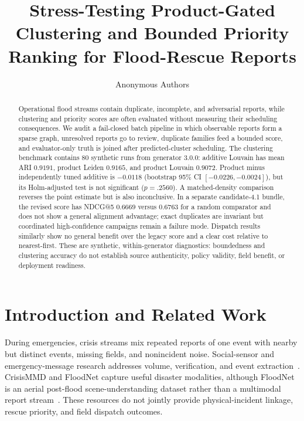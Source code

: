 \documentclass[runningheads]{llncs}
\begin{document}
\title{Stress-Testing Product-Gated Clustering and Bounded Priority
Ranking for Flood-Rescue Reports}

\author{Anonymous Authors}

\maketitle

\begin{abstract}
Operational flood streams contain duplicate, incomplete, and adversarial
reports, while clustering and priority scores are often evaluated without
measuring their scheduling consequences. We audit a fail-closed batch
pipeline in which observable reports form a sparse graph, unresolved reports
go to review, duplicate families feed a bounded score, and evaluator-only
truth is joined after predicted-cluster scheduling. The clustering benchmark
contains 80 synthetic runs from generator 3.0.0: additive Louvain has mean
ARI $0.9191$, product Leiden $0.9165$, and product Louvain $0.9072$.
Product minus independently tuned additive is $-0.0118$ (bootstrap 95\% CI
$[-0.0226,-0.0024]$), but its Holm-adjusted test is not significant
($p=.2560$). A matched-density comparison reverses the point estimate but is
also inconclusive. In a separate candidate-4.1 bundle, the revised score
has NDCG@5 $0.6669$ versus $0.6763$ for a random comparator and does not
show a general alignment advantage; exact duplicates are invariant but
coordinated high-confidence campaigns remain a failure mode. Dispatch
results similarly show no general benefit over the legacy score and a clear
cost relative to nearest-first. These are synthetic, within-generator
diagnostics: boundedness and clustering accuracy do not establish source
authenticity, policy validity, field benefit, or deployment readiness.
\end{abstract}

\section{Introduction and Related Work}

During emergencies, crisis streams mix repeated reports of one event with
nearby but distinct events, missing fields, and nonincident noise. Social-sensor
and emergency-message research addresses volume, verification, and event
extraction~\cite{sakaki2010earthquake}.
CrisisMMD and FloodNet capture useful disaster modalities, although FloodNet
is an aerial post-flood scene-understanding dataset rather than a multimodal
report stream~\cite{alam2018crisismmd,rahnemoonfar2021floodnet}. These resources
do not jointly provide physical-incident linkage, rescue priority, and field
dispatch outcomes.
\end{document}
